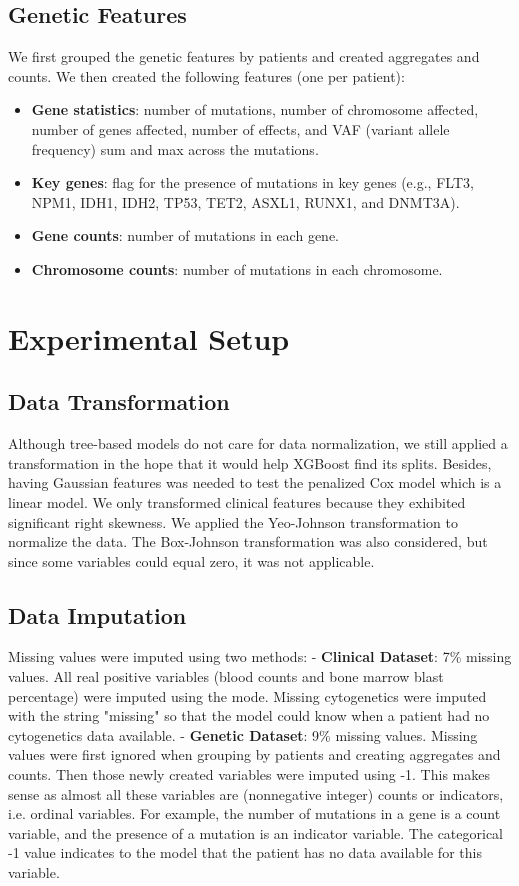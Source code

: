 \documentclass{article}
\begin{document}
\subsection{Genetic Features}
We first grouped the genetic features by patients and created aggregates and counts. We then created the following features (one per patient):
\begin{itemize}
    \item \textbf{Gene statistics}: number of mutations, number of chromosome affected, number of genes affected, number of effects, and VAF (variant allele frequency) sum and max across the mutations.
    \item \textbf{Key genes}: flag for the presence of mutations in key genes (e.g., FLT3, NPM1, IDH1, IDH2, TP53, TET2, ASXL1, RUNX1, and DNMT3A).
    \item \textbf{Gene counts}: number of mutations in each gene.
    \item \textbf{Chromosome counts}: number of mutations in each chromosome.
\end{itemize}

\section{Experimental Setup}
\subsection{Data Transformation}
Although tree-based models do not care for data normalization, we still applied a transformation in the hope that it would help XGBoost find its splits. Besides, having Gaussian features was needed to test the penalized Cox model which is a linear model. We only transformed clinical features because they exhibited significant right skewness. We applied the Yeo-Johnson transformation to normalize the data. The Box-Johnson transformation was also considered, but since some variables could equal zero, it was not applicable.

\subsection{Data Imputation}
Missing values were imputed using two methods:
- \textbf{Clinical Dataset}: 7\% missing values. All real positive variables (blood counts and bone marrow blast percentage) were imputed using the mode. Missing cytogenetics were imputed with the string "missing" so that the model could know when a patient had no cytogenetics data available.
- \textbf{Genetic Dataset}: 9\% missing values. Missing values were first ignored when grouping by patients and creating aggregates and counts. Then those newly created variables were imputed using -1. This makes sense as almost all these variables are (nonnegative integer) counts or indicators, i.e. ordinal variables. For example, the number of mutations in a gene is a count variable, and the presence of a mutation is an indicator variable. The categorical -1 value indicates to the model that the patient has no data available for this variable. 
\end{document}
